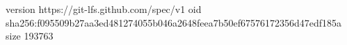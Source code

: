 version https://git-lfs.github.com/spec/v1
oid sha256:f095509b27aa3ed481274055b046a2648feea7b50ef67576172356d47edf185a
size 193763
